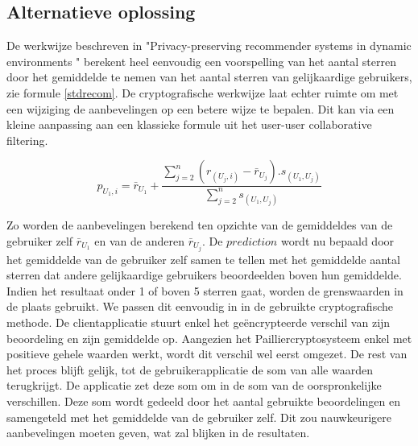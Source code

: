 \subsection{Alternatieve oplossing}
De werkwijze beschreven in "Privacy-preserving recommender systems in dynamic environments \cite{ZErkinDyn}" berekent heel eenvoudig een voorspelling van het aantal sterren door het gemiddelde te nemen van het aantal sterren van gelijkaardige gebruikers, zie formule \ref{stdrecom}. De cryptografische werkwijze laat echter ruimte om met een wijziging de aanbevelingen op een betere wijze te bepalen. Dit kan via een kleine aanpassing aan een klassieke formule uit het user-user collaborative filtering.

\begin{equation}\label{stdrecom}p_{U_1,i} = \bar{r}_{U_1} + \frac{\sum_{j=2}^{n}(r_{(U_j,i)} - \bar{r}_{U_j}).s_{(U_1,U_j)}}{\sum_{j=2}^{n} s_{(U_1,U_j)}}
\end{equation}

Zo worden de aanbevelingen berekend ten opzichte van de gemiddeldes van de gebruiker zelf $\bar{r}_{U_1}$ en van de anderen $\bar{r}_{U_j}$. De $prediction$ wordt nu bepaald door het gemiddelde van de gebruiker zelf samen te tellen met het gemiddelde aantal sterren dat andere gelijkaardige gebruikers beoordeelden boven hun gemiddelde. Indien het resultaat onder 1 of boven 5 sterren gaat, worden de grenswaarden in de plaats gebruikt.
We passen dit eenvoudig in in de gebruikte cryptografische methode. De clientapplicatie stuurt enkel het ge\"encrypteerde verschil van zijn beoordeling en zijn gemiddelde op. Aangezien het Pailliercryptosysteem enkel met positieve gehele waarden werkt, wordt dit verschil wel eerst omgezet. De rest van het proces blijft gelijk, tot de gebruikerapplicatie de som van alle waarden terugkrijgt. De applicatie zet deze som om in de som van de oorspronkelijke verschillen. Deze som wordt gedeeld door het aantal gebruikte beoordelingen en samengeteld met het gemiddelde van de gebruiker zelf. Dit zou nauwkeurigere aanbevelingen moeten geven, wat zal blijken in de resultaten.